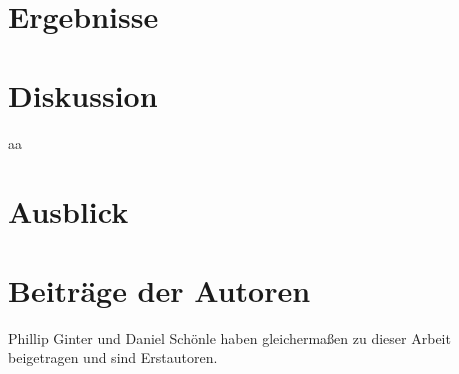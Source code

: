 \section{Ergebnisse}

\section{Diskussion}
aa
\section{Ausblick}

\section{Beiträge der Autoren}
 Phillip Ginter und Daniel Schönle haben gleichermaßen zu dieser Arbeit beigetragen und sind Erstautoren.